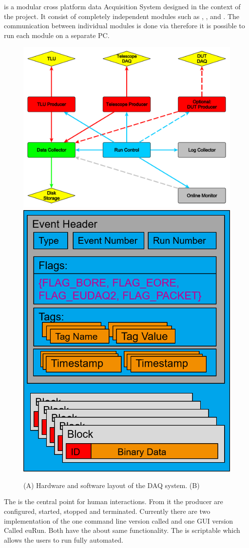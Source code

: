 \eudaq is a modular cross platform data Acquisition System designed in the context of the \eudet project. 
It consist of completely independent modules such as \rc, \logcollector, \dc and \producer. 
The communication between individual modules is done via \tcp therefore it is possible to run each module on a separate PC. 


\begin{figure}[tb]
	\center
	\includegraphics[width=.55\textwidth]{figures/eudaq}
	\includegraphics[width=.38\textwidth]{figures/rawdataevent.png}
	\caption[DAQ_System]{(A) Hardware and software layout of the DAQ system. (B) \rawdataevent}
	\label{fig:todo}
\end{figure}

% 	


The \rc is the central point for human interactions. 
From it the producer are configured, started, stopped and terminated. 
Currently there are two implementation of the \rc one command line version called \testrc and one GUI version Called euRun. 
Both have the about same functionality. The \testrc is scriptable which allows the users to run fully automated. 

